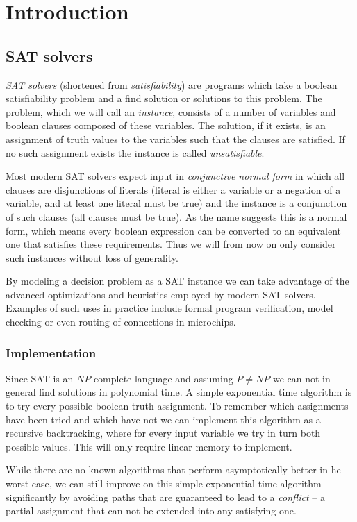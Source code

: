 \chapter{Introduction}
\section{SAT solvers}
\emph{SAT solvers} (shortened from \emph{satisfiability}) are programs which take a boolean satisfiability problem and a find solution or solutions to this problem.
The problem, which we will call an \emph{instance}, consists of a number of variables and boolean clauses composed of these variables.
The solution, if it exists, is an assignment of truth values to the variables such that the clauses are satisfied.
If no such assignment exists the instance is called \emph{unsatisfiable}.

Most modern SAT solvers expect input in \emph{conjunctive normal form} in which all clauses are disjunctions of literals (literal is either a variable or a negation of a variable, and at least one literal must be true) and the instance is a conjunction of such clauses (all clauses must be true).
As the name suggests this is a normal form, which means every boolean expression can be converted to an equivalent one that satisfies these requirements.
Thus we will from now on only consider such instances without loss of generality.

By modeling a decision problem as a SAT instance we can take advantage of the advanced optimizations and heuristics employed by modern SAT solvers.
Examples of such uses in practice include formal program verification, model checking or even routing of connections in microchips.

\subsection{Implementation}
Since SAT is an $NP$-complete language and assuming $P \neq NP$ we can not in general find solutions in polynomial time.
A simple exponential time algorithm is to try every possible boolean truth assignment.
To remember which assignments have been tried and which have not we can implement this algorithm as a recursive backtracking, where for every input variable we try in turn both possible values.
This will only require linear memory to implement.

While there are no known algorithms that perform asymptotically better in he worst case, we can still improve on this simple exponential time algorithm significantly by avoiding paths that are guaranteed to lead to a \emph{conflict} -- a partial assignment that can not be extended into any satisfying one.

